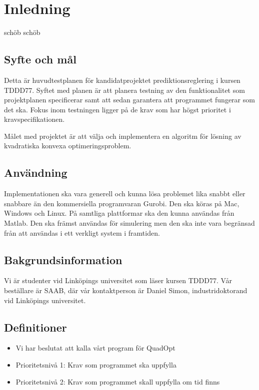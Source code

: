 \section{Inledning}
schöb schöb

\subsection{Syfte och mål}
Detta är huvudtestplanen för kandidatprojektet prediktionsreglering i kursen TDDD77. Syftet med planen är att planera testning av den funktionalitet som projektplanen specificerar samt att sedan garantera att programmet fungerar som det ska. Fokus inom testningen ligger på de krav som har högst prioritet i kravspecifikationen.

Målet med projektet är att välja och implementera en algoritm för lösning av kvadratiska konvexa optimeringsproblem.

\subsection{Användning}
Implementationen ska vara generell och kunna lösa problemet lika snabbt eller snabbare än den kommersiella programvaran Gurobi. Den ska köras på Mac, Windows och Linux. På samtliga plattformar ska den kunna användas från Matlab. Den ska främst användas för simulering men den ska inte vara begränsad från att användas i ett verkligt system i framtiden. 

\subsection{Bakgrundsinformation}
Vi är studenter vid Linköpings universitet som läser kursen TDDD77. Vår beställare är SAAB, där vår kontaktperson är Daniel Simon, industridoktorand vid Linköpings universitet. 

\subsection{Definitioner}

\begin{itemize}
\item{Vi har beslutat att kalla vårt program för QuadOpt}
\item{Prioritetsnivå 1: Krav som programmet ska uppfylla}
\item{Prioritetsnivå 2: Krav som programmet skall uppfylla om tid finns}
\end{itemize}
